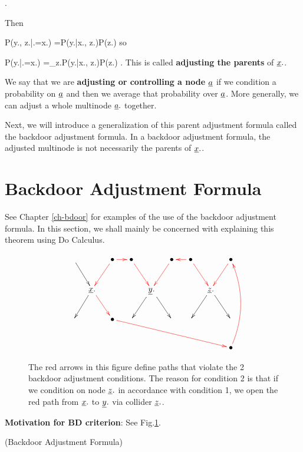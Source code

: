 \beq
{}
\;.
\eeq

Then

\beq
P(y., z.|\cald \rvx.=x.)
=P(y.|x., z.)P(z.)
\eeq
so

\beq
P(y.|\cald \rvx.=x.)
=\sum_{z.}P(y.|x., z.)P(z.)
\;.
\eeq
This is called
{\bf adjusting the parents}
of $\rvx.$.


We say that
we are {\bf adjusting
or controlling a node $\rva$}
if we condition
a probability on $\rva$ and
then we average
that probability over $\rva$.
More generally,
we can adjust a whole
multinode $\rva.$ together.

Next,
we will introduce
a generalization
of
this parent adjustment formula
called the
backdoor adjustment formula.
In a backdoor adjustment formula,
the adjusted multinode
is not necessarily
 the parents of $\rvx.$.

\section{Backdoor Adjustment Formula}

See Chapter \ref{ch-bdoor}
for examples of the use of the
backdoor adjustment formula.
In this section,
we shall mainly be
concerned with
explaining this
theorem
using Do Calculus.


\bdoordef

\begin{figure}[h!]
$$
\xymatrix@C=1pc{
\ar[dr]
&&\bullet\ar@[red][dl]\ar@[red][r]
&\bullet\ar@[red][dr]
&&\bullet\ar@[red][dl]
&\bullet\ar@[red][dr]\ar@[red][l]
&&\bullet\ar@[red][dl]
\\
&\rvx.
\ar[dl]
\ar@[red][dr]
&&&\rvy.
\ar[dl]
\ar[dr]
&&&{\rvz.}
\ar[dl]
\ar[dr]
\\
&&\bullet\ar@[red][drrrrrr]&&&&&&
\\
&&&&&&&&\bullet\ar@/_1pc/@[red][uuu]
}
$$
\caption{The red arrows in this figure define paths 
that violate the 2 backdoor adjustment conditions.
 The reason for condition 2 is that
 if we condition on node $\rvz.$
 in accordance with condition 1, we open the
 red  path from $\rvx.$ to $\rvy.$
 via collider $\rvz.$.}
 \label{fig-bdoor-red-paths}
\end{figure}
{\bf Motivation for BD criterion}:
See Fig.\ref{fig-bdoor-red-paths}.



\begin{claim} (Backdoor
Adjustment Formula)

\bdoorclaim
\end{claim}
\proof

